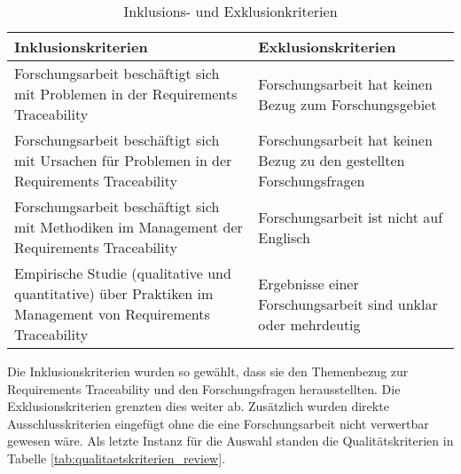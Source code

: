 \begin{table}[!ht]
\renewcommand{\arraystretch}{1.3}
\centering
\begin{threeparttable}
\begin{tabularx}{\columnwidth}{@{}XX@{}}
\toprule
Inklusionskriterien & Exklusionskriterien \\ \midrule
Forschungsarbeit beschäftigt sich mit Problemen in der Requirements Traceability & Forschungsarbeit hat keinen Bezug zum Forschungsgebiet \\
Forschungsarbeit beschäftigt sich mit Ursachen für Problemen in der Requirements Traceability & Forschungsarbeit hat keinen Bezug zu den gestellten Forschungsfragen \\
Forschungsarbeit beschäftigt sich mit Methodiken im Management der Requirements Traceability & Forschungsarbeit ist nicht auf Englisch \\
Empirische Studie (qualitative und quantitative) über Praktiken im Management von Requirements Traceability & Ergebnisse einer Forschungsarbeit sind unklar oder mehrdeutig \\
\bottomrule
\end{tabularx}
\medskip
\end{threeparttable}
\caption{Inklusions- und Exklusionkriterien}
\label{tab:inklusions_exklusionkriterien}
\end{table}

Die Inklusionskriterien wurden so gewählt, dass sie den Themenbezug zur Requirements Traceability und den Forschungsfragen herausstellten. Die Exklusionskriterien grenzten dies weiter ab. Zusätzlich wurden direkte Ausschlusskriterien eingefügt ohne die eine Forschungsarbeit nicht verwertbar gewesen wäre. Als letzte Instanz für die Auswahl standen die Qualitätskriterien in Tabelle \ref{tab:qualitaetskriterien_review}.

